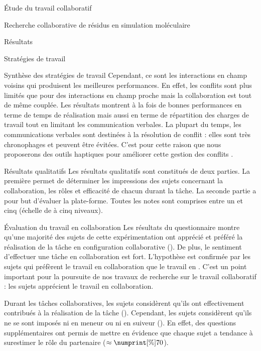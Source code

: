 \documentclass[myfrancais]{mythesis}
\begin{document}
\begin{mypart}{Étude du travail collaboratif}
\begin{mychapter}{Recherche collaborative de résidus en simulation moléculaire}
\begin{mysection}{Résultats}
\begin{mysubsection}{Stratégies de travail}
\begin{mysubsubsection}{Synthèse des stratégies de travail}
						Cependant, ce sont les interactions en champ voisins qui produisent les meilleures performances.
						En effet, les conflits sont plus limités que pour des interactions en champ proche mais la collaboration est tout de même couplée.
						Les résultats montrent à la fois de bonnes performances en terme de temps de réalisation mais aussi en terme de répartition des charges de travail tout en limitant les communication verbales.
						La plupart du temps, les communications verbales sont destinées à la résolution de conflit : elles sont très chronophages et peuvent être évitées.
						C'est pour cette raison que nous proposerons des outils haptiques pour améliorer cette gestion des conflits .
					\end{mysubsubsection}
				\end{mysubsection}
				\begin{mysubsection}{Résultats qualitatifs}
					Les résultats qualitatifs sont constitués de deux parties.
					La première permet de déterminer les impressions des sujets concernant la collaboration, les rôles et efficacité de chacun durant la tâche.
					La seconde partie a pour but d'évaluer la plate-forme.
					Toutes les notes sont comprises entre un et cinq (échelle de  à cinq niveaux).
					\begin{mysubsubsection}{Évaluation du travail en collaboration}
						Les résultats du questionnaire montre qu'une majorité des sujets de cette expérimentation ont apprécié et préféré la réalisation de la tâche en configuration collaborative ().
						De plus, le sentiment d'effectuer une tâche en collaboration est fort.
						L'hypothèse  est confirmée par les sujets qui préfèrent le travail en collaboration que le travail en .
						C'est un point important pour la poursuite de nos travaux de recherche sur le travail collaboratif : les sujets apprécient le travail en collaboration.

						Durant les tâches collaboratives, les sujets considèrent qu'ils ont effectivement contribués à la réalisation de la tâche ().
						Cependant, les sujets considèrent qu'ils ne se sont imposés ni en meneur ou ni en suiveur ().
						En effet, des questions supplémentaires ont permis de mettre en évidence que chaque sujet a tendance à surestimer le rôle du partenaire ($\approx\mynum[\%]{70}$).


\end{mysubsubsection}
\end{mysubsection}
\end{mysection}
\end{mychapter}
\end{mypart}
\end{document}
